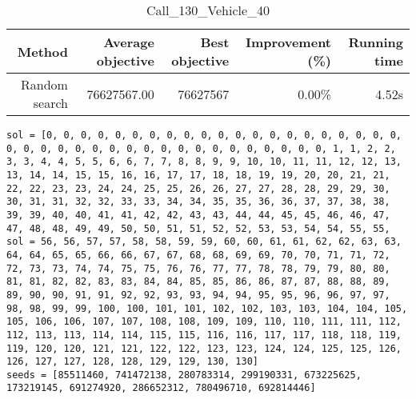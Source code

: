 \begin{table}[ht]
\centering
\caption{Call\_130\_Vehicle\_40}
\label{tab:call130vehicle40}
\begin{tabular}{|r|r|r|r|r|}
Method & Average objective & Best objective & Improvement (\%) & Running time \\
\hline
Random search & 76627567.00 & 76627567 & 0.00\% & 4.52s\\
\end{tabular}%
\end{table}
\begin{lstlisting}[label={lst:call130vehicle40},caption=Optimal solution call\_130\_vehicle\_40]
sol = [0, 0, 0, 0, 0, 0, 0, 0, 0, 0, 0, 0, 0, 0, 0, 0, 0, 0, 0, 0, 0, 0, 0, 0, 0, 0, 0, 0, 0, 0, 0, 0, 0, 0, 0, 0, 0, 0, 0, 0, 1, 1, 2, 2, 3, 3, 4, 4, 5, 5, 6, 6, 7, 7, 8, 8, 9, 9, 10, 10, 11, 11, 12, 12, 13, 13, 14, 14, 15, 15, 16, 16, 17, 17, 18, 18, 19, 19, 20, 20, 21, 21, 22, 22, 23, 23, 24, 24, 25, 25, 26, 26, 27, 27, 28, 28, 29, 29, 30, 30, 31, 31, 32, 32, 33, 33, 34, 34, 35, 35, 36, 36, 37, 37, 38, 38, 39, 39, 40, 40, 41, 41, 42, 42, 43, 43, 44, 44, 45, 45, 46, 46, 47, 47, 48, 48, 49, 49, 50, 50, 51, 51, 52, 52, 53, 53, 54, 54, 55, 55,
sol = 56, 56, 57, 57, 58, 58, 59, 59, 60, 60, 61, 61, 62, 62, 63, 63, 64, 64, 65, 65, 66, 66, 67, 67, 68, 68, 69, 69, 70, 70, 71, 71, 72, 72, 73, 73, 74, 74, 75, 75, 76, 76, 77, 77, 78, 78, 79, 79, 80, 80, 81, 81, 82, 82, 83, 83, 84, 84, 85, 85, 86, 86, 87, 87, 88, 88, 89, 89, 90, 90, 91, 91, 92, 92, 93, 93, 94, 94, 95, 95, 96, 96, 97, 97, 98, 98, 99, 99, 100, 100, 101, 101, 102, 102, 103, 103, 104, 104, 105, 105, 106, 106, 107, 107, 108, 108, 109, 109, 110, 110, 111, 111, 112, 112, 113, 113, 114, 114, 115, 115, 116, 116, 117, 117, 118, 118, 119, 119, 120, 120, 121, 121, 122, 122, 123, 123, 124, 124, 125, 125, 126, 126, 127, 127, 128, 128, 129, 129, 130, 130]
seeds = [85511460, 741472138, 280783314, 299190331, 673225625, 173219145, 691274920, 286652312, 780496710, 692814446]
\end{lstlisting}
\clearpage


